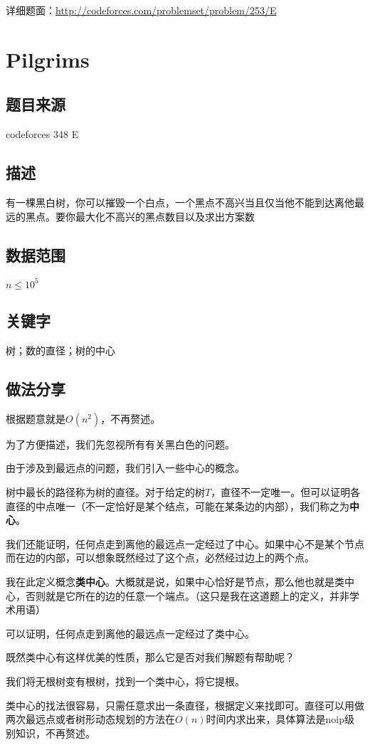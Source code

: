 \documentclass{ctexart}
\begin{document}
			详细题面：\href{http://codeforces.com/problemset/problem/253/E}{http://codeforces.com/problemset/problem/253/E}
	\newpage
	\section{Pilgrims}
		\subsection{题目来源}
			codeforces 348 E
		\subsection{描述}
			有一棵黑白树，你可以摧毁一个白点，一个黑点不高兴当且仅当他不能到达离他最远的黑点。要你最大化不高兴的黑点数目以及求出方案数
		\subsection{数据范围}
			$n \le 10^5$
		\subsection{关键字}
			树；数的直径；树的中心
		\subsection{做法分享}
			根据题意就是$O(n^2)$，不再赘述。

			为了方便描述，我们先忽视所有有关黑白色的问题。

			由于涉及到最远点的问题，我们引入一些中心的概念。

			树中最长的路径称为树的直径。对于给定的树$T$，直径不一定唯一。但可以证明各直径的中点唯一（不一定恰好是某个结点，可能在某条边的内部），我们称之为{\textbf{中心}}。

			我们还能证明，任何点走到离他的最远点一定经过了中心。如果中心不是某个节点而在边的内部，可以想象既然经过了这个点，必然经过边上的两个点。	

			我在此定义概念{\textbf{类中心}}。大概就是说，如果中心恰好是节点，那么他也就是类中心，否则就是它所在的边的任意一个端点。（这只是我在这道题上的定义，并非学术用语）

			可以证明，任何点走到离他的最远点一定经过了类中心。

			既然类中心有这样优美的性质，那么它是否对我们解题有帮助呢？

			我们将无根树变有根树，找到一个类中心，将它提根。
	
			类中心的找法很容易，只需任意求出一条直径，根据定义来找即可。直径可以用做两次最远点或者树形动态规划的方法在$O(n)$时间内求出来，具体算法是noip级别知识，不再赘述。
\end{document}

